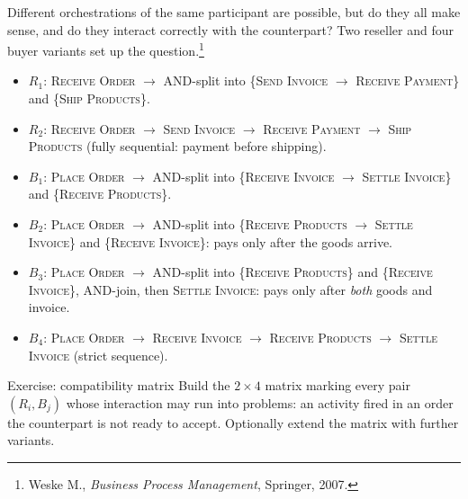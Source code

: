 Different orchestrations of the same participant are possible, but do they all make sense, and do they interact correctly with the counterpart? Two reseller and four buyer variants set up the question.\footnote{Weske M., \emph{Business Process Management}, Springer, 2007.}
\begin{itemize}
  \item \textbf{$R_1$}: \textsc{Receive Order} $\to$ AND-split into \{\textsc{Send Invoice} $\to$ \textsc{Receive Payment}\} and \{\textsc{Ship Products}\}.
  \item \textbf{$R_2$}: \textsc{Receive Order} $\to$ \textsc{Send Invoice} $\to$ \textsc{Receive Payment} $\to$ \textsc{Ship Products} (fully sequential: payment before shipping).
  \item \textbf{$B_1$}: \textsc{Place Order} $\to$ AND-split into \{\textsc{Receive Invoice} $\to$ \textsc{Settle Invoice}\} and \{\textsc{Receive Products}\}.
  \item \textbf{$B_2$}: \textsc{Place Order} $\to$ AND-split into \{\textsc{Receive Products} $\to$ \textsc{Settle Invoice}\} and \{\textsc{Receive Invoice}\}: pays only after the goods arrive.
  \item \textbf{$B_3$}: \textsc{Place Order} $\to$ AND-split into \{\textsc{Receive Products}\} and \{\textsc{Receive Invoice}\}, AND-join, then \textsc{Settle Invoice}: pays only after \emph{both} goods and invoice.
  \item \textbf{$B_4$}: \textsc{Place Order} $\to$ \textsc{Receive Invoice} $\to$ \textsc{Receive Products} $\to$ \textsc{Settle Invoice} (strict sequence).
\end{itemize}

\begin{examplebox}{Exercise: compatibility matrix}
Build the $2 \times 4$ matrix marking every pair $(R_i, B_j)$ whose interaction may run into problems: an activity fired in an order the counterpart is not ready to accept. Optionally extend the matrix with further variants.
\end{examplebox}

